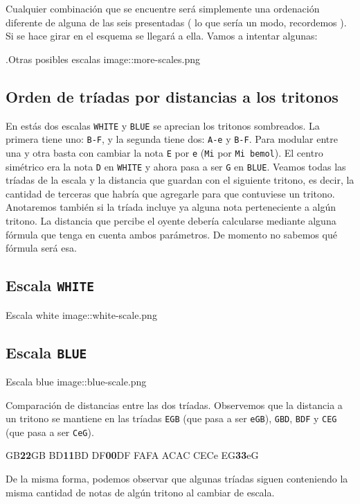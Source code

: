 \documentclass[]{article}
\begin{document}
Cualquier combinación que se encuentre será simplemente una ordenación diferente de alguna de las seis presentadas ( lo que sería un modo, recordemos ). Si se hace girar en el esquema se llegará a ella. Vamos a intentar algunas:

.Otras posibles escalas image::more-scales.png

\subsection{Orden de tríadas por distancias a los tritonos}

En estás dos escalas \texttt{WHITE} y \texttt{BLUE} se aprecian los tritonos sombreados. La primera tiene uno: \texttt{B-F}, y la segunda tiene dos: \texttt{A-e} y \texttt{B-F}. Para modular entre una y otra basta con cambiar la nota \texttt{E} por \texttt{e} (\texttt{Mi} por \texttt{Mi\ bemol}). El centro simétrico era la nota \texttt{D} en \texttt{WHITE} y ahora pasa a ser \texttt{G} en \texttt{BLUE}. Veamos todas las tríadas de la escala y la distancia que guardan con el siguiente tritono, es decir, la cantidad de terceras que habría que agregarle para que contuviese un tritono. Anotaremos también si la tríada incluye ya alguna nota perteneciente a algún tritono. La distancia que percibe el oyente debería calcularse mediante alguna fórmula que tenga en cuenta ambos parámetros. De momento no sabemos qué fórmula será esa.

\subsection{Escala \texttt{WHITE} }

Escala white image::white-scale.png

\subsection{Escala \texttt{BLUE} }

Escala blue image::blue-scale.png

Comparación de distancias entre las dos tríadas. Observemos que la distancia a un tritono se mantiene en las tríadas \texttt{EGB} (que pasa a ser \texttt{eGB}), \texttt{GBD}, \texttt{BDF} y \texttt{CEG} (que pasa a ser \texttt{CeG}).

GB\textbf{2}\textbf{2}GB BD\textbf{1}\textbf{1}BD DF\textbf{0}\textbf{0}DF FAFA ACAC CECe EG\textbf{3}\textbf{3}eG

De la misma forma, podemos observar que algunas tríadas siguen conteniendo la misma cantidad de notas de algún tritono al cambiar de escala.
\end{document}
